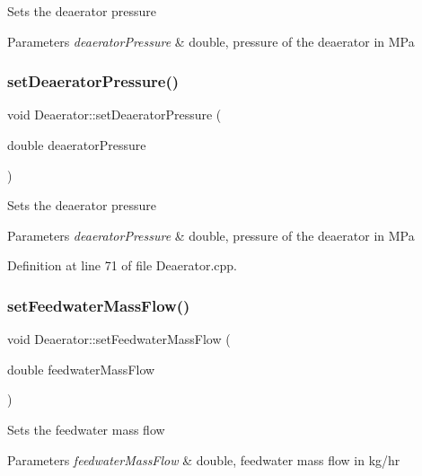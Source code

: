 Sets the deaerator pressure 
\begin{DoxyParams}{Parameters}
{\em deaerator\+Pressure} & double, pressure of the deaerator in M\+Pa \\
\hline
\end{DoxyParams}
\mbox{\label{class_deaerator_a5b20d3aba98b21928cce70b45e843ff3}} 
\subsubsection{\texorpdfstring{set\+Deaerator\+Pressure()}{setDeaeratorPressure()}\hspace{0.1cm}{\footnotesize\ttfamily [3/3]}}
{\footnotesize\ttfamily void Deaerator\+::set\+Deaerator\+Pressure (\begin{DoxyParamCaption}\item[{double}]{deaerator\+Pressure }\end{DoxyParamCaption})}

Sets the deaerator pressure 
\begin{DoxyParams}{Parameters}
{\em deaerator\+Pressure} & double, pressure of the deaerator in M\+Pa \\
\hline
\end{DoxyParams}


Definition at line 71 of file Deaerator.\+cpp.

\mbox{\label{class_deaerator_ada95cb2557bc43602d7bcefbad66c853}} 
\subsubsection{\texorpdfstring{set\+Feedwater\+Mass\+Flow()}{setFeedwaterMassFlow()}\hspace{0.1cm}{\footnotesize\ttfamily [1/3]}}
{\footnotesize\ttfamily void Deaerator\+::set\+Feedwater\+Mass\+Flow (\begin{DoxyParamCaption}\item[{double}]{feedwater\+Mass\+Flow }\end{DoxyParamCaption})}

Sets the feedwater mass flow 
\begin{DoxyParams}{Parameters}
{\em feedwater\+Mass\+Flow} & double, feedwater mass flow in kg/hr \\
\hline
\end{DoxyParams}


